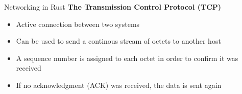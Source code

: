 \begin{frame}{Networking in Rust}
    \textbf{The Transmission Control Protocol (TCP)}

    \begin{itemize}
        \item<2-> Active connection between two systems
        \item<3-> Can be used to send a continous stream of octets to another host
        \item<4-> A sequence number is assigned to each octet in order to confirm it was received
        \item<5> If no acknowledgment (ACK) was received, the data is sent again
    \end{itemize}

\end{frame}
